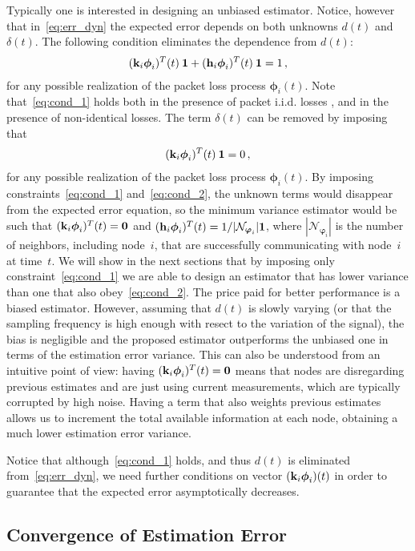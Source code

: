 \documentclass[a4paper,notitlepage,onecolumn]{article}
\def\1{\mathbf{1}}
\def\0{\mathbf{0}}
\def\k{{\bf k}}
\def\h{{\bf h}}
\def\phib{\boldsymbol{\phi}}
\def\varphib{\boldsymbol{\varphi}}
\numberwithin{equation}{section}
\begin{document}
Typically one is interested in designing an unbiased estimator.
Notice, however that in~\eqref{eq:err_dyn} the expected error
depends on both unknowns $d(t)$ and $\delta(t)$.  The following
condition eliminates the dependence from $d(t)$:
\begin{align}
    (\k_{i}\phib_i)^T(t)\:\1 + (\h_{i}\phib_i)^T(t)\:\1 =
    1\,,
    \label{eq:cond_1}
\end{align}
for any possible realization of the packet loss process
$\phib_i(t)$. Note that~\eqref{eq:cond_1} holds both in the
presence of packet i.i.d. losses , and in the presence of
non-identical losses. The term $\delta(t)$ can be removed by
imposing that
\begin{align}
    (\k_{i}\phib_i)^T(t)\:\1 = 0\,,
    \label{eq:cond_2}
\end{align}
for any possible realization of the packet loss process
$\phib_i(t)$. By imposing constraints~\eqref{eq:cond_1}
and~\eqref{eq:cond_2}, the unknown terms would disappear from the
expected error equation, so the minimum variance estimator would
be such that $(\k_{i}\phib_i)^T(t)=\0$ and $(\h_{i}\phib_i)^T(t) =
1/|\mathcal{N}_{\varphib_i}|\1$, where
$|\mathcal{N}_{\varphib_i}|$ is the number of neighbors, including
node~$i$, that are successfully communicating with node~$i$ at
time~$t$. We will show in the next sections that by imposing only
constraint~\eqref{eq:cond_1} we are able to design an estimator
that has lower variance than one that also obey~\eqref{eq:cond_2}.
The price paid for better performance is a biased estimator.
However, assuming that $d(t)$ is slowly varying (or that the
sampling frequency is high enough with resect to the variation of
the signal), the bias is negligible and the proposed estimator
outperforms the unbiased one in terms of the estimation error
variance. This can also be understood from an intuitive point of
view: having $(\k_{i}\phib_i)^T(t)=\0$ means that nodes are
disregarding previous estimates and are just using current
measurements, which are typically corrupted by high noise. Having
a term that also weights previous estimates allows us to increment
the total available information at each node, obtaining a much
lower estimation error variance.

Notice that although~\eqref{eq:cond_1} holds, and thus $d(t)$ is
eliminated from~\eqref{eq:err_dyn}, we need further conditions on
vector $(\k_{i}\phib_i)(t)$ in order to guarantee that the
expected error asymptotically decreases.

\subsection{Convergence of Estimation Error}
\end{document}
